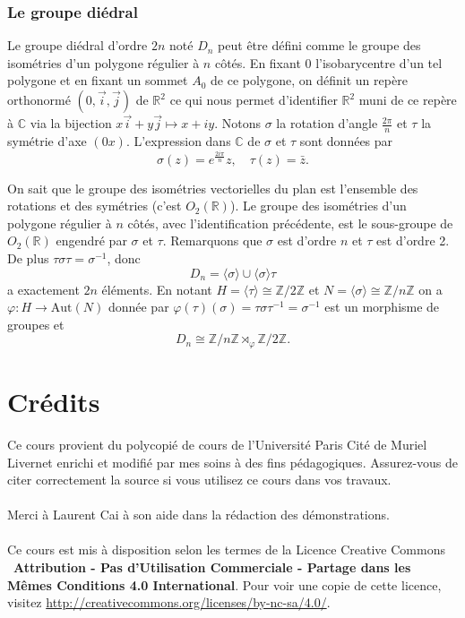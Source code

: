 \documentclass{article}
\begin{document}
\subsubsection{Le groupe diédral}

Le groupe diédral d'ordre $2n$ noté $D_n$ peut être défini comme le groupe des isométries d'un polygone régulier à $n$ côtés. En fixant 0 l'isobarycentre d'un tel polygone et en fixant un sommet $A_0$ de ce polygone, on définit un repère orthonormé $(0, \vec{i}, \vec{j})$ de $\mathbb{R}^2$ ce qui nous permet d'identifier $\mathbb{R}^2$ muni de ce repère à $\mathbb{C}$ via la bijection $x\vec{i} + y\vec{j} \mapsto x + iy$. Notons $\sigma$ la rotation d'angle $\frac{2\pi}{n}$ et $\tau$ la symétrie d'axe $(0x)$. L'expression dans $\mathbb{C}$ de $\sigma$ et $\tau$ sont données par
\[
\sigma(z) = e^{\frac{2i\pi}{n}}z, \quad \tau(z) = \bar{z}.
\]

On sait que le groupe des isométries vectorielles du plan est l'ensemble des rotations et des symétries (c'est $O_2(\mathbb{R})$). Le groupe des isométries d'un polygone régulier à $n$ côtés, avec l'identification précédente, est le sous-groupe de $O_2(\mathbb{R})$ engendré par $\sigma$ et $\tau$. Remarquons que $\sigma$ est d'ordre $n$ et $\tau$ est d'ordre 2. De plus $\tau\sigma\tau = \sigma^{-1}$, donc
\[
D_n = \langle \sigma \rangle \cup \langle \sigma \rangle \tau
\]
a exactement $2n$ éléments. En notant $H = \langle \tau \rangle \cong \mathbb{Z}/2\mathbb{Z}$ et $N = \langle \sigma \rangle \cong \mathbb{Z}/n\mathbb{Z}$ on a $\varphi : H \to \mathrm{Aut}(N)$ donnée par $\varphi(\tau)(\sigma) = \tau\sigma\tau^{-1} = \sigma^{-1}$ est un morphisme de groupes et
\[
D_n \cong \mathbb{Z}/n\mathbb{Z} \rtimes_\varphi \mathbb{Z}/2\mathbb{Z}.
\]
\newpage
\tableofcontents
\section*{Crédits}
Ce cours provient du polycopié de cours de l'Université Paris Cité de Muriel Livernet enrichi et modifié par mes soins à des fins pédagogiques. Assurez-vous de citer correctement la source si vous utilisez ce cours dans vos travaux.\\\\
Merci à Laurent Cai à son aide dans la rédaction des démonstrations.\\\\
Ce cours est mis à disposition selon les termes de la Licence Creative Commons \ccbyncsa\ \textbf{Attribution - Pas d'Utilisation Commerciale - Partage dans les Mêmes Conditions 4.0 International}. 
Pour voir une copie de cette licence, visitez \url{http://creativecommons.org/licenses/by-nc-sa/4.0/}.
\end{document}
